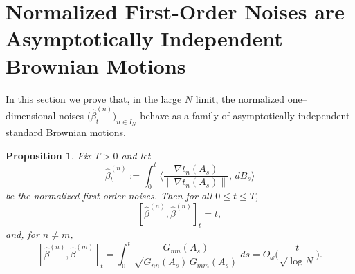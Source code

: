 \documentclass[12pt,reqno]{amsart}
\theoremstyle{plain}
\newtheorem{prop}{Proposition}[section]
\theoremstyle{definition}
\theoremstyle{remark}
\begin{document}
\section{Normalized First-Order Noises are Asymptotically Independent Brownian Motions}
\label{s:7}

In this section we prove that, in the large $N$ limit, the normalized
one–dimensional noises $ \big (\hat \beta^{(n)}_t\big)_{n\in I_N}$
behave as a family of asymptotically independent standard Brownian motions.

 
\begin{prop} \label{thm:hatbeta}
Fix $T>0$ and let
\begin{equation}\label{eq:def-hatbeta}
\hat\beta^{(n)}_t:=\int_0^t\Big\langle \frac{\nabla t_n(A_s)}{\|\nabla t_n(A_s)\|},\,dB_s\Big\rangle
\end{equation}
be the normalized first-order noises. Then for all $0\le t\le T$,
\begin{equation}\label{eq:hatbeta-diag}
[\hat\beta^{(n)},\hat\beta^{(n)}]_t=t,
\end{equation}
and, for $n\neq m$,
\begin{equation}\label{eq:hatbeta-off}
[\hat\beta^{(n)},\hat\beta^{(m)}]_t
=\int_0^t \frac{G_{nm}(A_s)}{\sqrt{G_{nn}(A_s)\,G_{mm}(A_s)}}\,ds
=O_\omega\!\Big(\frac{t}{\sqrt{\log N}}\Big).
\end{equation}
\end{prop}
\end{document}

